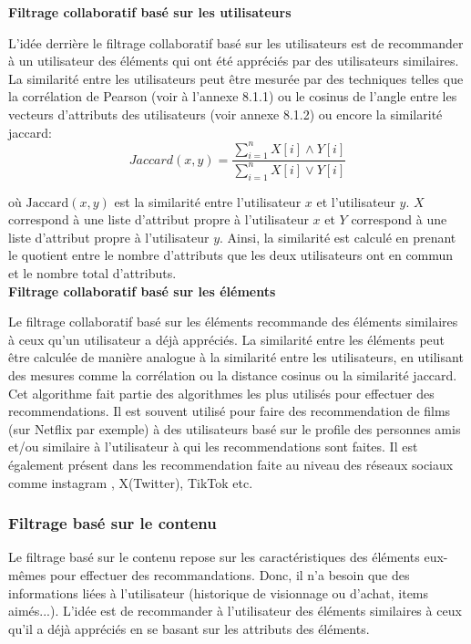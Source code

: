 \documentclass[11pt]{article}
\begin{document}
\textbf{Filtrage collaboratif basé sur les utilisateurs}

L'idée derrière le filtrage collaboratif basé sur les utilisateurs est de recommander à un utilisateur des éléments qui ont été appréciés par des utilisateurs similaires. La similarité entre les utilisateurs peut être mesurée par des techniques telles que la corrélation de Pearson (voir à l'annexe 8.1.1) ou le cosinus de l'angle entre les vecteurs d'attributs des utilisateurs (voir annexe 8.1.2) ou encore la similarité jaccard:
\begin{equation}
Jaccard(x, y) = \frac{\sum_{i = 1}^n X[i] \land Y[i]}{\sum_{i = 1}^n X[i] \vee Y[i]}
\end{equation}
\label{jaccard}

où $\text{Jaccard}(x, y)$ est la similarité entre l'utilisateur $x$ et l'utilisateur $y$. $X$ correspond à une liste d'attribut propre à l'utilisateur $x$ et $Y$ correspond à une liste d'attribut propre à l'utilisateur $y$. Ainsi, la similarité est calculé en prenant le quotient entre le nombre d'attributs que les deux utilisateurs ont en commun et le nombre total d'attributs.\\

\textbf{Filtrage collaboratif basé sur les éléments}

Le filtrage collaboratif basé sur les éléments recommande des éléments similaires à ceux qu'un utilisateur a déjà appréciés. La similarité entre les éléments peut être calculée de manière analogue à la similarité entre les utilisateurs, en utilisant des mesures comme la corrélation ou la distance cosinus ou la similarité jaccard.\\

Cet algorithme fait partie des algorithmes les plus utilisés pour effectuer des recommendations. Il est souvent utilisé pour faire des recommendation de films (sur Netflix par exemple) à des utilisateurs basé sur le profile des personnes amis et/ou similaire à l'utilisateur à qui les recommendations sont faites. Il est également présent dans les recommendation faite au niveau des réseaux sociaux comme instagram \cite{anandhan2018social}, X(Twitter), TikTok etc.

\subsubsection{Filtrage basé sur le contenu}
Le filtrage basé sur le contenu repose sur les caractéristiques des éléments eux-mêmes pour effectuer des recommandations. Donc, il n'a besoin que des informations liées à l'utilisateur (historique de visionnage ou d'achat, items aimés...). L'idée est de recommander à l'utilisateur des éléments similaires à ceux qu'il a déjà appréciés en se basant sur les attributs des éléments.
\end{document}

